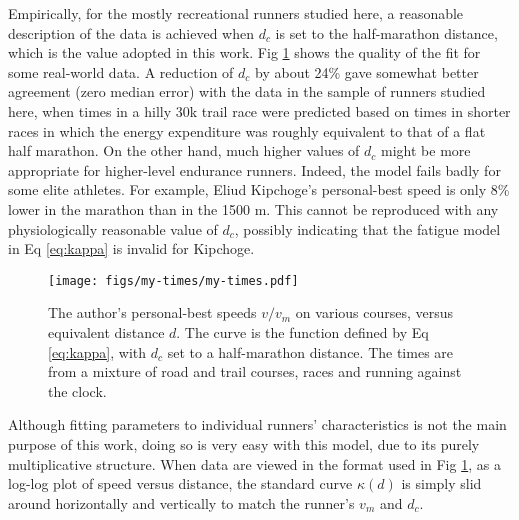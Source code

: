 \documentclass[10pt,letterpaper]{article}
\begin{document}
Empirically, for the mostly recreational runners studied here, a reasonable description of the data is achieved when
$d_c$ is set to the half-marathon distance, which is the value adopted in this work.
Fig \ref{fig:my-times} shows the quality of the fit for some real-world data.
A reduction of $d_c$ by about 24\% gave somewhat better agreement (zero median error) with the data in the sample of runners studied
here,  when times in a hilly 30k trail race were
predicted based on times in shorter races in which the energy expenditure was roughly equivalent to that of
a flat half marathon.
On the other hand, much higher values of $d_c$ might be more appropriate for higher-level endurance runners.
Indeed, the model fails badly for some elite athletes. For example, Eliud Kipchoge's personal-best
speed is only 8\% lower in the marathon than in the 1500 m. This cannot be reproduced with any physiologically
reasonable value of $d_c$, possibly indicating that the fatigue model in Eq \ref{eq:kappa} is invalid for Kipchoge.

\begin{figure}[h]
\texttt{[image: figs/my-times/my-times.pdf]}
\centering
\caption{The author's personal-best speeds $v/v_m$ on various courses, versus equivalent distance $d$.
The curve is the function defined by Eq \ref{eq:kappa}, with $d_c$ set to a half-marathon distance.
The times are from a mixture of road and trail courses, races and running against the clock.}
\label{fig:my-times}
\end{figure}

Although fitting parameters to individual runners' characteristics is not the main purpose of this work, doing
so is very easy with this model, due to its purely multiplicative structure.
When data are viewed in the format used in Fig \ref{fig:my-times}, as a log-log plot of speed versus distance,
the standard curve $\kappa(d)$ is simply slid around horizontally and vertically to match the runner's $v_m$ and $d_c$.


\end{document}
